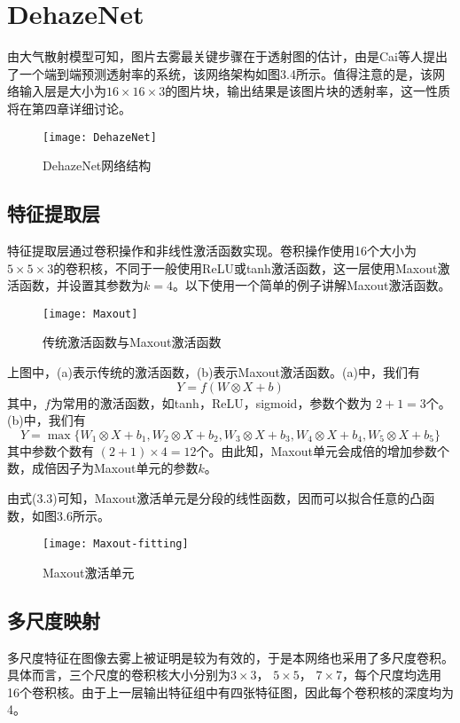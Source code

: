 \documentclass[a4paper, 12pt, oneside]{report}
\begin{document}
{\section{DehazeNet\quad}
由大气散射模型可知，图片去雾最关键步骤在于透射图的估计，由是Cai\cite{ref16}等人提出了一个端到端预测透射率的系统，该网络架构如图3.4所示。值得注意的是，该网络输入层是大小为$16 \times 16 \times 3$的图片块，输出结果是该图片块的透射率，这一性质将在第四章详细讨论。
\begin{figure}[h]
\centering
\texttt{[image: DehazeNet]}
\caption{DehazeNet网络结构}
\end{figure}

\subsection{特征提取层\quad}
特征提取层通过卷积操作和非线性激活函数实现。卷积操作使用16个大小为$5 \times 5 \times 3$的卷积核，不同于一般使用ReLU或tanh激活函数，这一层使用Maxout\cite{ref19}激活函数，并设置其参数为$k = 4$。以下使用一个简单的例子讲解Maxout激活函数。
\begin{figure}[H]
\centering
\texttt{[image: Maxout]}
\caption{传统激活函数与Maxout激活函数}
\end{figure}
上图中，(a)表示传统的激活函数，(b)表示Maxout激活函数。(a)中，我们有$$Y = f(W \otimes X + b)$$
其中，$f$为常用的激活函数，如tanh，ReLU，sigmoid，参数个数为 $2 + 1 = 3$个。(b)中，我们有
\begin{equation}
Y = \max\{W_1 \otimes X + b_1, W_2 \otimes X + b_2, W_3 \otimes X + b_3, W_4 \otimes X + b_4, W_5 \otimes X + b_5\}
\end{equation}
其中参数个数有 $(2 + 1) \times 4 = 12$个。由此知，Maxout单元会成倍的增加参数个数，成倍因子为Maxout单元的参数$k$。

由式(3.3)可知，Maxout激活单元是分段的线性函数，因而可以拟合任意的凸函数，如图3.6所示。
\begin{figure}[H]
\centering
\texttt{[image: Maxout-fitting]}
\caption{Maxout激活单元}
\end{figure}

\subsection{多尺度映射\quad}
多尺度特征在图像去雾上被证明是较为有效的，于是本网络也采用了多尺度卷积。具体而言，三个尺度的卷积核大小分别为$3\times 3$， $5\times 5$， $7\times 7$，每个尺度均选用16个卷积核。由于上一层输出特征组中有四张特征图，因此每个卷积核的深度均为4。

}
\end{document}
